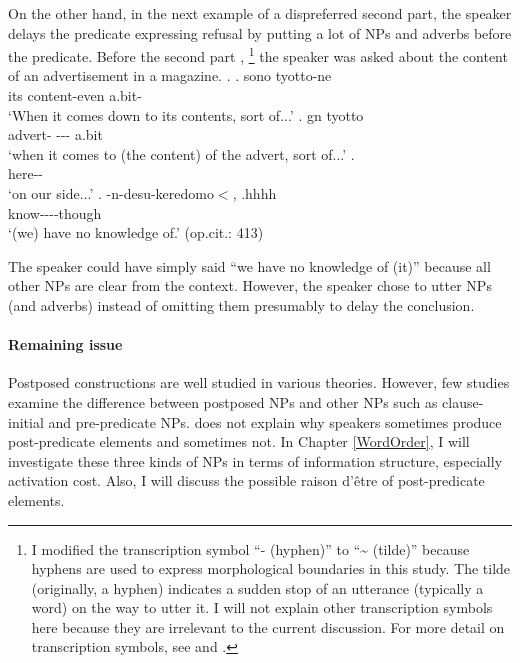 On the other hand, in the next example of a dispreferred second part,
the speaker delays the predicate expressing refusal
by putting a lot of NPs and adverbs before the predicate.
Before the second part \Next,%
 \footnote{
 I modified the transcription symbol ``- (hyphen)'' to ``{\textasciitilde} (tilde)'' because hyphens are used to express morphological boundaries in this study.
 The tilde (originally, a hyphen) indicates a sudden stop of an utterance (typically a word) on the way to utter it.
 I will not explain other transcription symbols here because
 they are irrelevant to the current discussion.
 For more detail on transcription symbols,
 see  and .
 }
the speaker was asked about the content of an advertisement in a magazine.
%
\ex.
 \ag. sono  tyotto-ne \\
      its \hspace{0.2cm}content-even a.bit- \\
      `When it comes down to its contents, sort of...'
 \bg.  gn  tyotto \\
      advert-  --- a.bit \\
      `when it comes to (the content) of the advert, sort of...'
 \bg.  \\
      here-- \\
      `on our side...'
 \bg. -n-desu-keredomo$<$, .hhhh \\
      know----though \\
      `(we) have no knowledge of.'
      \hfill{(op.cit.: 413)}

The speaker could have simply said ``we have no knowledge of (it)''
because all other NPs are clear from the context.
However, the speaker chose to utter NPs (and adverbs) instead of omitting them presumably to delay the conclusion.

\paragraph{Remaining issue}

Postposed constructions are well studied in various theories.
However, few studies examine the difference between postposed NPs and
other NPs such as clause-initial and pre-predicate NPs.
 does not explain why speakers sometimes produce
post-predicate elements and sometimes not.
In Chapter \ref{WordOrder},
I will investigate these three kinds of NPs in terms of information structure,
especially activation cost.
Also, I will discuss the possible raison d'{\^{e}}tre of post-predicate elements.

